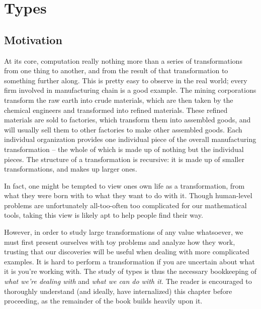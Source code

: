 \chapter{Types}
\section{Motivation}
At its core, computation really nothing more than a series of
transformations from one thing to another, and from the result of that transformation to something further along. This
is pretty easy to observe in the real world; every firm involved in manufacturing chain is a good example. The mining
corporations transform the raw earth into crude materials, which are then taken by the chemical engineers and
transformed into refined materials. These refined materials are sold to factories, which transform them into assembled
goods, and will usually sell them to other factories to make other assembled goods. Each individual organization
provides one individual piece of the overall manufacturing transformation -- the whole of which is made up of nothing
but the individual pieces. The structure of a transformation is recursive: it is made up of smaller transformations, and
makes up larger ones.

In fact, one might be tempted to view ones own life as a transformation, from what they were born with to what they want
to do with it. Though human-level problems are unfortunately all-too-often too complicated for our
mathematical tools, taking this view is likely apt to help people find their
way.

However, in order to study large transformations of any value whatsoever, we must first present ourselves with toy
problems and analyze how they work, trusting that our discoveries will be useful when dealing with more complicated
examples. It is hard to perform a transformation if you are uncertain about what it is you're working with. The study of
types is thus the necessary bookkeeping of \textit{what we're dealing with} and \textit{what we can do with it}. The
reader is encouraged to thoroughly understand (and ideally, have internalized) this chapter before proceeding, as the
remainder of the book builds heavily upon it.


